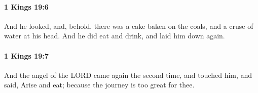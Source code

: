 		\paragraph{1 Kings 19:6} %
			\label{1KINGS-19-6}

			And he looked, and, behold, there was a cake baken on the coals, and a cruse of water at his head. And he did eat and drink, and laid him down again.


		\paragraph{1 Kings 19:7} %
			\label{1KINGS-19-7}

			And the angel of the LORD came again the second time, and touched him, and said, Arise and eat; because the journey is too great for thee.


